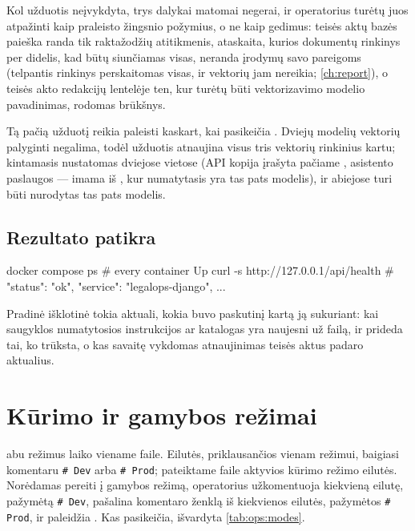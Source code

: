 Kol užduotis neįvykdyta, trys dalykai matomai negerai, ir operatorius turėtų juos atpažinti kaip
praleisto žingsnio požymius, o ne kaip gedimus: teisės aktų bazės paieška randa tik raktažodžių
atitikmenis, ataskaita, kurios dokumentų rinkinys per didelis, kad būtų siunčiamas visas, neranda
įrodymų savo pareigoms (telpantis rinkinys perskaitomas visas, ir vektorių jam nereikia;
\cref{ch:report}), o teisės akto redakcijų lentelėje ten, kur
turėtų būti vektorizavimo modelio pavadinimas, rodomas brūkšnys.

Tą pačią užduotį reikia paleisti kaskart, kai pasikeičia . Dviejų modelių
vektorių palyginti negalima, todėl užduotis atnaujina visus tris vektorių rinkinius kartu; kintamasis
nustatomas dviejose vietose (API kopija įrašyta pačiame , asistento
paslaugos --- imama iš , kur numatytasis yra tas pats modelis), ir abiejose turi būti
nurodytas tas pats modelis.

\subsection{Rezultato patikra}

\begin{codeblock}
docker compose ps                       # every container Up
curl -s http://127.0.0.1/api/health     # {"status": "ok", "service": "legalops-django", ...}
\end{codeblock}

Pradinė išklotinė
tokia aktuali, kokia buvo paskutinį kartą ją sukuriant: kai saugyklos numatytosios instrukcijos ar katalogas yra
naujesni už failą,  ir  prideda tai, ko trūksta, o kas savaitę
vykdomas atnaujinimas teisės aktus padaro aktualius.


\section{Kūrimo ir gamybos režimai}\label{sec:ops:modes}

 abu režimus laiko viename faile. Eilutės, priklausančios vienam režimui,
baigiasi komentaru \texttt{\# Dev} arba \texttt{\# Prod}; pateiktame faile aktyvios kūrimo režimo
eilutės. Norėdamas pereiti į gamybos režimą, operatorius užkomentuoja kiekvieną eilutę, pažymėtą
\texttt{\# Dev}, pašalina komentaro ženklą iš kiekvienos eilutės, pažymėtos \texttt{\# Prod}, ir
paleidžia . Kas pasikeičia, išvardyta \cref{tab:ops:modes}.

